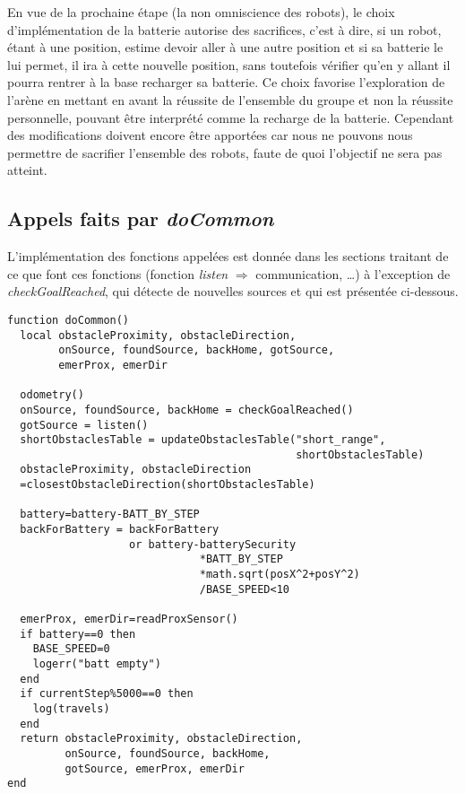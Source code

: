 En vue de la prochaine étape (la non omniscience des robots), le choix d'implémentation de la batterie autorise des sacrifices, c'est à dire, si un robot, étant à une position, estime devoir aller à une autre position et si sa batterie le lui permet, il ira à cette nouvelle position, sans toutefois vérifier qu'en y allant il pourra rentrer à la base recharger sa batterie. Ce choix favorise l'exploration de l'arène en mettant en avant la réussite de l'ensemble du groupe et non la réussite personnelle, pouvant être interprété comme la recharge de la batterie. Cependant des modifications doivent encore être apportées car nous ne pouvons nous permettre de sacrifier l'ensemble des robots, faute de quoi l'objectif ne sera pas atteint.

\begin{subappendices}
  \subsection{Appels faits par \emph{doCommon}}

  L'implémentation des fonctions appelées est donnée dans les sections traitant de ce que font ces fonctions (fonction \emph{listen} $\Rightarrow$ communication, \ldots) à l'exception de \emph{checkGoalReached}, qui détecte de nouvelles sources et qui est présentée ci-dessous.
\begin{lstlisting}[caption=fonction doCommon]
function doCommon()
  local obstacleProximity, obstacleDirection,
        onSource, foundSource, backHome, gotSource,
        emerProx, emerDir

  odometry()
  onSource, foundSource, backHome = checkGoalReached()
  gotSource = listen()
  shortObstaclesTable = updateObstaclesTable("short_range",
                                             shortObstaclesTable)
  obstacleProximity, obstacleDirection
  =closestObstacleDirection(shortObstaclesTable)

  battery=battery-BATT_BY_STEP
  backForBattery = backForBattery 
                   or battery-batterySecurity
                              *BATT_BY_STEP
                              *math.sqrt(posX^2+posY^2)
                              /BASE_SPEED<10

  emerProx, emerDir=readProxSensor()
  if battery==0 then
    BASE_SPEED=0
    logerr("batt empty")
  end
  if currentStep%5000==0 then
    log(travels)
  end
  return obstacleProximity, obstacleDirection,
         onSource, foundSource, backHome,
         gotSource, emerProx, emerDir
end
\end{lstlisting}


\end{subappendices}
